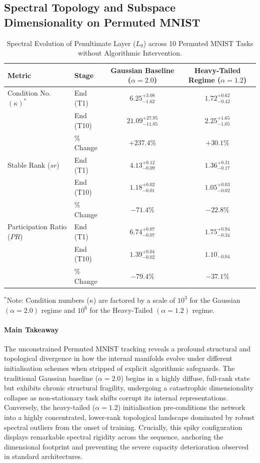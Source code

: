 \documentclass[10pt,a4paper]{article}
\begin{document}
	\subsection{Spectral Topology and Subspace Dimensionality on Permuted MNIST}
	
	\begin{table}[htbp]
		\centering
		\caption{Spectral Evolution of Penultimate Layer ($L_9$) across 10 Permuted MNIST Tasks without Algorithmic Intervention.}
		\label{tab:pmnist_spectral_topology}
		\small
		\renewcommand{\arraystretch}{1.4}
		\begin{tabular}{llcc}
			\hline
			\textbf{Metric} & \textbf{Stage} & \textbf{Gaussian Baseline ($\alpha=2.0$)} & \textbf{Heavy-Tailed Regime ($\alpha=1.2$)} \\ \hline
			Condition No. $(\kappa)^*$ & End (T1) & $6.25^{+3.08}_{-1.62}$ & $1.72^{+0.62}_{-0.42}$ \\
			& End (T10) & $21.09^{+27.95}_{-11.05}$ & $2.25^{+1.65}_{-1.05}$ \\
			& \% Change & $+237.4\%$ & $+30.1\%$ \\ \hline
			Stable Rank ($sr$)         & End (T1) & $4.13^{+0.12}_{-0.09}$ & $1.36^{+0.31}_{-0.17}$ \\
			& End (T10) & $1.18^{+0.02}_{-0.01}$ & $1.05^{+0.03}_{-0.02}$ \\
			& \% Change & $-71.4\%$ & $-22.8\%$ \\ \hline
			Participation Ratio ($PR$) & End (T1) & $6.74^{+0.07}_{-0.07}$ & $1.75^{+0.94}_{-0.34}$ \\
			& End (T10) & $1.39^{+0.04}_{-0.02}$ & $1.10^{\cdot}_{-0.04}$ \\
			& \% Change & $-79.4\%$ & $-37.1\%$ \\ \hline
		\end{tabular}
		\vskip 4pt
		\raggedright \footnotesize $^*$Note: Condition numbers ($\kappa$) are factored by a scale of $10^3$ for the Gaussian $(\alpha=2.0)$ regime and $10^6$ for the Heavy-Tailed $(\alpha=1.2)$ regime.
	\end{table}
	
	\paragraph{Main Takeaway}
	The unconstrained Permuted MNIST tracking reveals a profound structural and topological divergence in how the internal manifolds evolve under different initialisation schemes when stripped of explicit algorithmic safeguards. The traditional Gaussian baseline ($\alpha=2.0$) begins in a highly diffuse, full-rank state but exhibits chronic structural fragility, undergoing a catastrophic dimensionality collapse as non-stationary task shifts corrupt its internal representations. Conversely, the heavy-tailed ($\alpha=1.2$) initialisation pre-conditions the network into a highly concentrated, lower-rank topological landscape dominated by robust spectral outliers from the onset of training. Crucially, this spiky configuration displays remarkable spectral rigidity across the sequence, anchoring the dimensional footprint and preventing the severe capacity deterioration observed in standard architectures.
	
\end{document}
